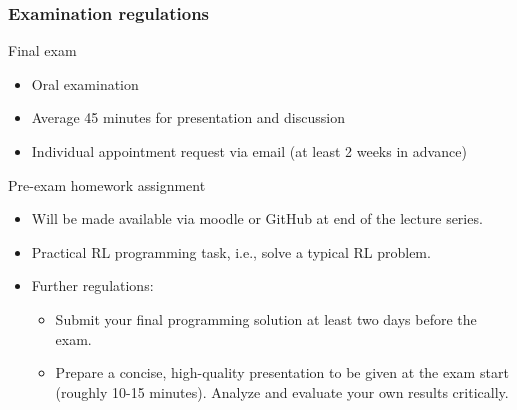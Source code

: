 \begin{frame}
	\frametitle{Examination regulations}
	\begin{block}{Final exam}
		\begin{itemize}
			\item Oral examination
			\item Average 45 minutes for presentation and discussion
			\item Individual appointment request via email (at least 2 weeks in advance)
		\end{itemize}
	\end{block}
	\pause
	\begin{block}{Pre-exam homework assignment}
		\begin{itemize}
			\item Will be made available via moodle or GitHub at end of the lecture series.
			\item Practical RL programming task, i.e., solve a typical RL problem.
			\item Further regulations:
			      \begin{itemize}
				      \item Submit your final programming solution at least two days before the exam.
				      \item Prepare a concise, high-quality presentation to be given at the exam start (roughly 10-15 minutes). Analyze and evaluate your own results critically.
			      \end{itemize}
		\end{itemize}
	\end{block}
\end{frame}


